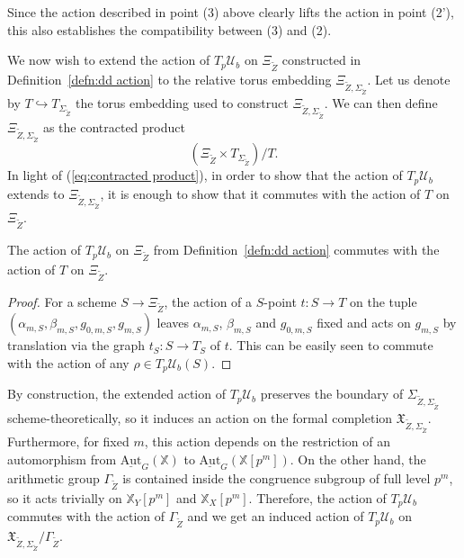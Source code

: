 \documentclass[letterpaper,11pt]{amsart}
\begin{document}
\begin{remark}  Since the action described in point (3) above clearly lifts the action in point (2'), this also
    establishes the compatibility between (3) and (2).
\end{remark}

We now wish to extend the action of $T_p\mathcal{U}_b$ on $\Xi_{\widetilde{Z}}$ constructed in Definition~\ref{defn:dd action} to the relative torus embedding $\Xi_{\widetilde{Z},\Sigma_{\widetilde{Z}}}$. Let us denote by $T\hookrightarrow T_{\Sigma_{\widetilde{Z}}}$ the torus embedding used to construct $\Xi_{\widetilde{Z},\Sigma_{\widetilde{Z}}}$. We can then define 
$\Xi_{\widetilde{Z},\Sigma_{\widetilde{Z}}}$ as the contracted product 
\begin{equation}\label{eq:contracted product}
\left(\Xi_{\widetilde{Z}}\times T_{\Sigma_{\widetilde{Z}}}\right)/ T. 
\end{equation}
In light of (\ref{eq:contracted product}), in order to show that the action of $T_p\mathcal{U}_b$ extends to $\Xi_{\widetilde{Z},\Sigma_{\widetilde{Z}}}$, it is enough to show that it commutes with the action of $T$ on $\Xi_{\widetilde{Z}}$. 

\begin{lemma}\label{lem: commutation with torus} The action of $T_p\mathcal{U}_b$ on $\Xi_{\widetilde{Z}}$ from Definition~\ref{defn:dd action} commutes with the action of $T$ on $\Xi_{\widetilde{Z}}$. 
\end{lemma}

\begin{proof} For a scheme $S\to \Xi_{\widetilde{Z}}$, the action of a $S$-point $t:S\to T$ on the tuple $(\alpha_{m,S}, \beta_{m,S}, g_{0,m,S}, g_{m,S})$ leaves $\alpha_{m,S}$, $\beta_{m,S}$ and $g_{0,m,S}$ fixed and acts on $g_{m,S}$ by translation via the graph $t_S: S\to T_S$ of $t$. This can be easily seen to commute with the action of any $\rho\in T_p\mathcal{U}_b(S)$.  
\end{proof}


 By construction, the extended action of $T_p\mathcal{U}_b$ preserves the boundary of $\Sigma_{\widetilde{Z}, \Sigma_{\widetilde{Z}}}$ scheme-theoretically, so it induces an action on the formal completion $\mathfrak{X}_{\widetilde{Z},\Sigma_{\widetilde{Z}}}$. 
 Furthermore, for fixed $m$, this action depends on the restriction of an automorphism from $\underline{\mathrm{Aut}}_G(\mathbb{X})$ to $\underline{\mathrm{Aut}}_G(\mathbb{X}[p^m])$. On the other hand, the arithmetic group $\Gamma_{\widetilde{Z}}$ is contained inside the congruence subgroup of full level $p^m$, so it acts trivially on $\mathbb{X}_{Y}[p^m]$ and $\mathbb{X}_X[p^m]$. Therefore, the action of $T_p\mathcal{U}_b$ commutes with the  action of $\Gamma_{\widetilde{Z}}$ and we
 get an induced action of $T_p\mathcal{U}_b$ on $\mathfrak{X}_{\widetilde{Z},\Sigma_{\widetilde{Z}}}/\Gamma_{\widetilde{Z}}$. 
\end{document}

